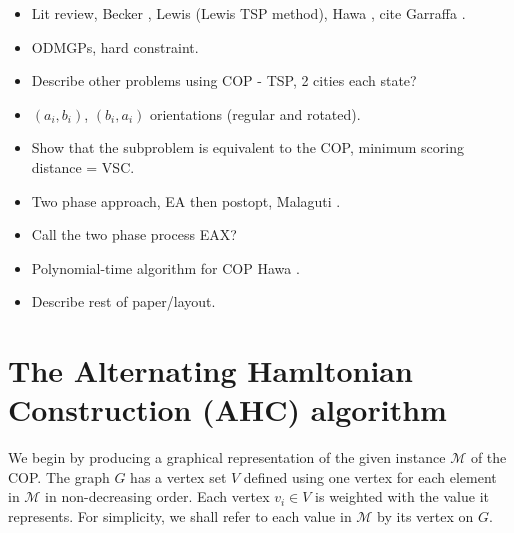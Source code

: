 \documentclass{elsarticle}
\begin{document}
{\color{Orange}
\begin{itemize}[leftmargin=*]
	\item Lit review, Becker \cite{becker2015}, Lewis \cite{lewis2011} (Lewis TSP method), Hawa \cite{hawa2018}, cite Garraffa \cite{garraffa2016}.
	\item ODMGPs, hard constraint.
	\item Describe other problems using COP - TSP, 2 cities each state?
	\item $(a_i, b_i)$, $(b_i, a_i)$ orientations (regular and rotated).
	\item Show that the subproblem is equivalent to the COP, minimum scoring distance = VSC.
	\item Two phase approach, EA then postopt, Malaguti \cite{malaguti2008}.
	\item Call the two phase process EAX?
	\item Polynomial-time algorithm for COP Hawa \cite{hawa2018}.
	\item Describe rest of paper/layout.
\end{itemize}
}


\section{The Alternating Hamltonian Construction (AHC) algorithm}
\label{sec:ahc}
We begin by producing a graphical representation of the given instance $\mathcal{M}$ of the COP. The graph $G$ has a vertex set $V$ defined using one vertex for each element in $\mathcal{M}$ in non-decreasing order. Each vertex $v_i \in V$ is weighted with the value it represents. For simplicity, we shall refer to each value in $\mathcal{M}$ by its vertex on $G$.
\end{document}
